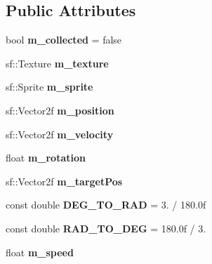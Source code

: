 \subsection*{Public Attributes}
\begin{DoxyCompactItemize}
\item 
\mbox{\label{class_worker_a737d86e6c4ee0ac68795c9767f3aa346}} 
bool {\bfseries m\+\_\+collected} = false
\item 
\mbox{\label{class_worker_ad5ef4caeba7332642a64ff135669020b}} 
sf\+::\+Texture {\bfseries m\+\_\+texture}
\item 
\mbox{\label{class_worker_a25d12889e0e55055b8731d3b52dd6e1e}} 
sf\+::\+Sprite {\bfseries m\+\_\+sprite}
\item 
\mbox{\label{class_worker_a00add12299316bd66a2dd67c7bc1e25f}} 
sf\+::\+Vector2f {\bfseries m\+\_\+position}
\item 
\mbox{\label{class_worker_a64f6c47c236420b91e3c0b28915b7434}} 
sf\+::\+Vector2f {\bfseries m\+\_\+velocity}
\item 
\mbox{\label{class_worker_a241bf09f83a8b02c18b7ec3ca2a5d151}} 
float {\bfseries m\+\_\+rotation}
\item 
\mbox{\label{class_worker_ab85105e0e353ce92467cb6b397b55f71}} 
sf\+::\+Vector2f {\bfseries m\+\_\+target\+Pos}
\item 
\mbox{\label{class_worker_a84d042d49cb78c064216e1ddc74ae550}} 
const double {\bfseries D\+E\+G\+\_\+\+T\+O\+\_\+\+R\+AD} = 3. / 180.\+0f
\item 
\mbox{\label{class_worker_a83a707751699634d4834319b9955a580}} 
const double {\bfseries R\+A\+D\+\_\+\+T\+O\+\_\+\+D\+EG} = 180.\+0f / 3.
\item 
\mbox{\label{class_worker_a349b7755216672f76050ddec9014481a}} 
float {\bfseries m\+\_\+speed}
\item 
\mbox{\label{class_worker_acc7497e66cb95c486a276ba99c63e6a5}} 

\end{DoxyCompactItemize}
